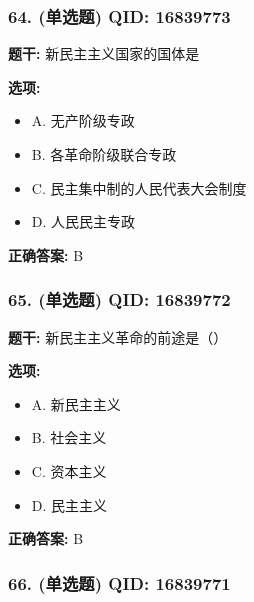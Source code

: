 \documentclass[12pt,UTF8]{ctexart}
\begin{document}
\subsubsection*{64. (单选题) \small QID: 16839773}

\textbf{题干:}
新民主主义国家的国体是

\textbf{选项:}
\begin{itemize}[leftmargin=*]

  \item A. 无产阶级专政

  \item B. 各革命阶级联合专政

  \item C. 民主集中制的人民代表大会制度

  \item D. 人民民主专政

\end{itemize}

\textbf{正确答案:}
B

\vspace{0.3em}\hrulefill\vspace{0.7em}

\subsubsection*{65. (单选题) \small QID: 16839772}

\textbf{题干:}
新民主主义革命的前途是（）

\textbf{选项:}
\begin{itemize}[leftmargin=*]

  \item A. 新民主主义

  \item B. 社会主义

  \item C. 资本主义

  \item D. 民主主义

\end{itemize}

\textbf{正确答案:}
B

\vspace{0.3em}\hrulefill\vspace{0.7em}

\subsubsection*{66. (单选题) \small QID: 16839771}
\end{document}
